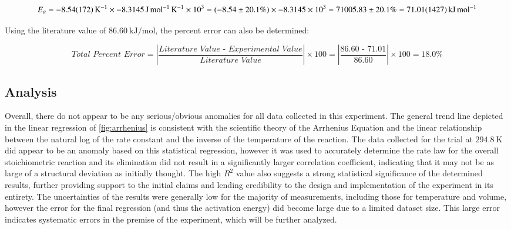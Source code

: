  \[E_a = \SI{-8.54\pm1.72}{\per\kelvin} \times -\SI{8.3145}{\joule\per\mole\per\kelvin} \times 10^3 = (-8.54 \pm 20.1\%) \times -8.3145 \times 10^3 = 71005.83 \pm 20.1\% = \SI{71.01\pm14.27}{\kilo\joule\per\mole}\]

 Using the literature value of $\SI{86.60}{\kilo\joule\per\mole}$, the percent error can also be determined:

 \[\textit{Total Percent Error} = \left|\frac{\textit{Literature Value - Experimental Value}}{\textit{Literature Value}}\right| \times 100 = \left|\frac{\textit{86.60 - 71.01}}{\textit{86.60}}\right| \times 100 = 18.0\%\]





\subsection{Analysis}
Overall, there do not appear to be any serious/obvious anomalies for all data collected in this experiment. The general trend line depicted in the linear regression of \cref{fig:arrhenius} is consistent with the scientific theory of the Arrhenius Equation and the linear relationship between the natural log of the rate constant and the inverse of the temperature of the reaction. The data collected for the trial at $\SI{294.8}{\kelvin}$ did appear to be an anomaly based on this statistical regression, however it was used to accurately determine the rate law for the overall stoichiometric reaction and its elimination did not result in a significantly larger correlation coefficient, indicating that it may not be as large of a structural deviation as initially thought. The high $R^2$ value also suggests a strong statistical significance of the determined results, further providing support to the initial claims and lending credibility to the design and implementation of the experiment in its entirety. The uncertainties of the results were generally low for the majority of measurements, including those for temperature and volume, however the error for the final regression (and thus the activation energy) did become large due to a limited dataset size. This large error indicates systematic errors in the premise of the experiment, which will be further analyzed. 


\newpage